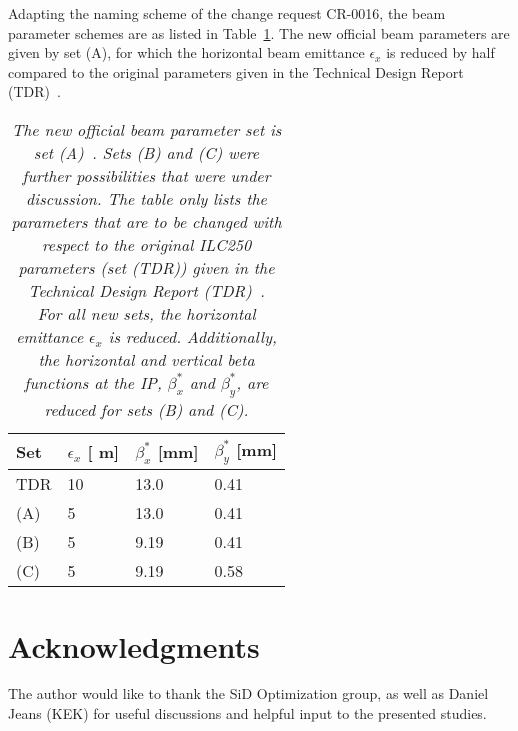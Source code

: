 \documentclass[12pt]{article}
\newcommand{\murm}{%
  \ifmmode
    \mathchoice
        {\hbox{\normalsize\textmu}}
        {\hbox{\normalsize\textmu}}
        {\hbox{\scriptsize\textmu}}
        {\hbox{\tiny\textmu}}%
  \else
    \textmu
  \fi
}
\begin{document}
Adapting the naming scheme of the change request CR-0016, the beam parameter schemes are as listed in Table~\ref{tab:Parameters}.
The new official beam parameters are given by set (A), for which the horizontal beam emittance  $\epsilon_x$ is reduced by half compared to the original parameters given in the Technical Design Report (TDR)~\cite[p. 11]{TDR1}.
\begin{table}[h]
\centering
\begin{tabularx}{0.52\textwidth}{llll}
\hline\hline
\textbf{Set}  & \textbf{$\epsilon_x$ [\murm m]} & \textbf{$\beta^*_x$ [mm]} & \textbf{$\beta^*_y$ [mm]}\\
\hline
\cline{1-4}
\hline
 TDR & 10 & 13.0 & 0.41\\
 \rowcolor{Gray}
 (A) & 5 & 13.0 & 0.41\\
 (B) & 5 & 9.19 & 0.41\\
 (C) & 5 & 9.19 & 0.58\\
\hline\hline
\end{tabularx}
\caption{\textit{The new official beam parameter set is set (A)~\cite{CR-0016}.
Sets (B) and (C) were further possibilities that were under discussion.
The table only lists the parameters that are to be changed with respect to the original ILC250 parameters (set (TDR)) given in the Technical Design Report (TDR)~\cite[p. 11]{TDR1}.\\
For all new sets, the horizontal emittance $\epsilon_x$ is reduced. 
Additionally, the horizontal and vertical beta functions at the IP, $\beta^*_x$ and $\beta^*_y$, are reduced for sets (B) and (C).}}
\label{tab:Parameters}
\end{table}







\section*{Acknowledgments}
The author would like to thank the SiD Optimization group, as well as Daniel Jeans (KEK) for useful discussions and helpful input to the presented studies.

%


\end{document}
